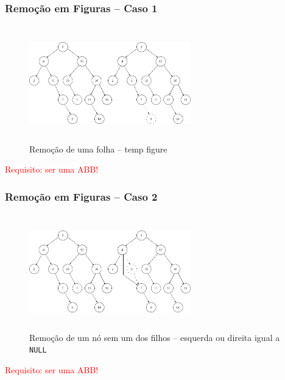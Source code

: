 \begin{frame}

\frametitle{Remoção em Figuras -- Caso 1}

   \begin{figure}[!ht]
    \centering
    \includegraphics[width=7cm, height=5cm]{figs/fig_arvores/remove0_arvore.jpg}
    \caption{Remoção de uma folha -- temp figure}
    \end{figure}

\begin{flushleft}
\textcolor{red}{Requisito: ser uma ABB!}
\end{flushleft}


\end{frame}
\begin{frame}

\frametitle{Remoção em Figuras  -- Caso 2}

   \begin{figure}[!ht]
    \centering
    \includegraphics[width=7cm, height=5cm]{figs/fig_arvores/remove1_arvore.jpg}
    \caption{Remoção de um nó sem um dos filhos -- esquerda ou direita igual a \texttt{NULL}}
    \end{figure}

\begin{flushleft}
\textcolor{red}{Requisito: ser uma ABB!}
\end{flushleft}


\end{frame}


